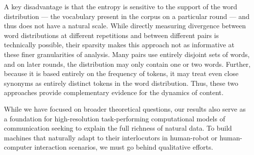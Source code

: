 A key disadvantage is that the entropy is sensitive to the support of the word distribution --- the vocabulary present in the corpus on a particular round --- and thus does not have a natural scale.
While directly measuring divergence between word distributions at different repetitions and between different pairs is technically possible, their sparsity makes this approach not as informative at these finer granularities of analysis.
Many pairs use entirely disjoint sets of words, and on later rounds, the distribution may only contain one or two words. 
Further, because it is based entirely on the frequency of tokens, it may treat even close synonyms as entirely distinct tokens in the word distribution. 
Thus, these two approaches provide complementary evidence for the dynamics of content.

While we have focused on broader theoretical questions, our results also serve as a foundation for high-resolution task-performing computational models of communication seeking to explain the full richness of natural data. 
To build machines that naturally adapt to their interlocutors in human-robot or human-computer interaction scenarios, we must go behind qualitative efforts.
